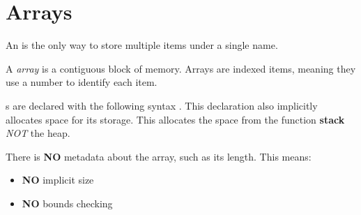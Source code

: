 \section{Arrays}\label{sec:Arrays}
An  is the only way to store multiple items under a single name.

\begin{definition}[Array]\label{def:Array}
  A \emph{array} is a contiguous block of memory.
  Arrays are indexed items, meaning they use a number to identify each item.
\end{definition}

s are declared with the following syntax .
This declaration also implicitly allocates space for its storage.
This allocates the space from the function \textbf{stack} \textit{NOT} the heap.

There is \textbf{NO} metadata about the array, such as its length.
This means:
\begin{itemize}[noitemsep]
\item \textbf{NO} implicit size
\item \textbf{NO} bounds checking
\end{itemize}


